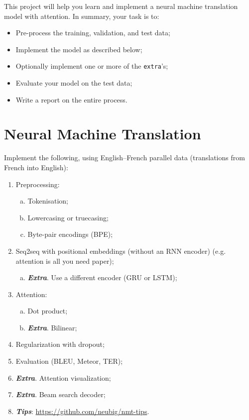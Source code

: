 
This project will help you learn and implement a neural machine translation model with attention.
In summary, your task is to:

\begin{itemize}
	\item Pre-process the training, validation, and test data;
	\item Implement the model as described below;
	\item Optionally implement one or more of the \texttt{extra}'s;
	\item Evaluate your model on the test data;
	\item Write a report on the entire process.
\end{itemize}

\section{Neural Machine Translation}

Implement the following, using English--French parallel data (translations from French into English):

\begin{enumerate}
	\item Preprocessing:
	\begin{enumerate}[a)]
		\item Tokenisation;
		\item Lowercasing or truecasing;
		\item Byte-pair encodings (BPE);
	\end{enumerate}
	\item Seq2seq with positional embeddings (without an RNN encoder) (e.g. attention is all you need paper);
	\begin{enumerate}[a)]
		\item \textbf{\textit{Extra}}. Use a different encoder (GRU or LSTM);
	\end{enumerate}
	\item Attention:
	\begin{enumerate}[a)]
		\item Dot product;
		\item \textbf{\textit{Extra}}. Bilinear;
	\end{enumerate}
	\item Regularization with dropout;
	\item Evaluation (BLEU, Meteor, TER);
	\item \textbf{\textit{Extra}}. Attention visualization;
	\item \textbf{\textit{Extra}}. Beam search decoder;
	\item \textbf{\textit{Tips}}: \url{https://github.com/neubig/nmt-tips}.
\end{enumerate}

